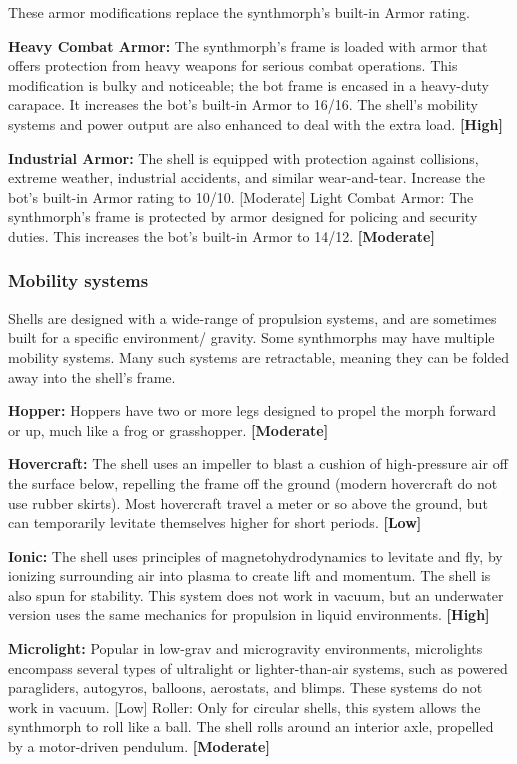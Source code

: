 These armor modifications replace the synthmorph’s built-in Armor rating.

\textbf{Heavy Combat Armor:} The synthmorph’s frame is loaded with armor that offers protection from heavy weapons for serious combat operations. This modification is bulky and noticeable; the bot frame is encased in a heavy-duty carapace. It increases the bot’s built-in Armor to 16/16. The shell’s mobility systems and power output are also enhanced to deal with the extra load. \textbf{[High]}

\textbf{Industrial Armor:} The shell is equipped with protection against collisions, extreme weather, industrial accidents, and similar wear-and-tear. Increase the bot’s built-in Armor rating to 10/10. [Moderate] Light Combat Armor: The synthmorph’s frame is protected by armor designed for policing and security duties. This increases the bot’s built-in Armor to 14/12. \textbf{[Moderate]}

\subsubsection{Mobility systems}

Shells are designed with a wide-range of propulsion systems, and are sometimes built for a specific environment/ gravity. Some synthmorphs may have multiple mobility systems. Many such systems are retractable, meaning they can be folded away into the shell’s frame.

\textbf{Hopper:} Hoppers have two or more legs designed to propel the morph forward or up, much like a frog or grasshopper. \textbf{[Moderate]}

\textbf{Hovercraft:} The shell uses an impeller to blast a cushion of high-pressure air off the surface below, repelling the frame off the ground (modern hovercraft do not use rubber skirts). Most hovercraft travel a meter or so above the ground, but can temporarily levitate themselves higher for short periods. \textbf{[Low]}

\textbf{Ionic:} The shell uses principles of magnetohydrodynamics to levitate and fly, by ionizing surrounding air into plasma to create lift and momentum. The shell is also spun for stability. This system does not work in vacuum, but an underwater version uses the same mechanics for propulsion in liquid environments. \textbf{[High]}

\textbf{Microlight:} Popular in low-grav and microgravity environments, microlights encompass several types of ultralight or lighter-than-air systems, such as powered paragliders, autogyros, balloons, aerostats, and blimps. These systems do not work in vacuum. [Low] Roller: Only for circular shells, this system allows the synthmorph to roll like a ball. The shell rolls around an interior axle, propelled by a motor-driven pendulum. \textbf{[Moderate]}

